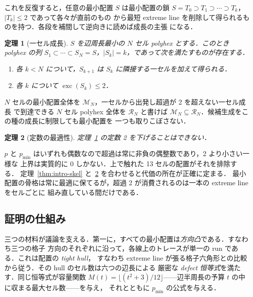 \documentclass[11pt]{article}
\theoremstyle{plain}
\newtheorem{theorem}{定理}[section]
\theoremstyle{definition}
\theoremstyle{remark}
\DeclareMathOperator{\exc}{exc}
\begin{document}
これを反復すると，任意の最小配置 \(S\) は最小配置の鎖
\(S=T_{0}\supset T_{1}\supset\cdots\supset T_{k}\)，\(|T_{k}|\le2\) であって各々が直前のもの
から最短 extreme line を削除して得られるものを持つ．各段を補間して逆向きに読めば成長の主張
になる．

\begin{theorem}[一セル成長]\label{thm:intro-main}
\(S\) を辺周長最小の \(N\) セル polyhex とする．このとき polyhex の列
\(S_{1}\subset\cdots\subset S_{N}=S\)，\(|S_{k}|=k\)，であって次を満たすものが存在する．
\begin{enumerate}
\item[(a)] 各 \(k<N\) について，\(S_{k+1}\) は \(S_{k}\) に隣接する一セルを加えて得られる．
\item[(b)] 各 \(k\) について \(\exc(S_{k})\le2\)．
\end{enumerate}
\end{theorem}

\(N\) セルの最小配置全体を \(\mathcal{M}_{N}\)，一セルから出発し超過が 2 を超えない一セル成長
で到達できる \(N\) セル polyhex 全体を \(\mathcal{R}_{N}\) と書けば
\(\mathcal{M}_{N}\subseteq\mathcal{R}_{N}\)．候補生成をこの種の成長に制限しても最小配置を
一つも取りこぼさない．

\begin{theorem}[定数の最適性]\label{thm:intro-sharp}
定理~\ref{thm:intro-main} の定数 2 を下げることはできない．
\end{theorem}

\(p\) と \(p_{\min}\) はいずれも偶数なので超過は常に非負の偶整数であり，2 より小さい一様な
上界は実質的に 0 しかない．上で触れた 13 セルの配置がそれを排除する．
定理~\ref{thm:intro-skel} と~\ref{thm:intro-sharp} を合わせると代価の所在が正確に定まる．
最小配置の骨格は常に最適に保てるが，超過 2 が消費されるのは一本の extreme line をセルごとに
組み直している間だけである．

\subsection{証明の仕組み}\label{sec:0.3}

三つの材料が議論を支える．第一に，すべての最小配置は\emph{方向凸}である．すなわち三つの格子
方向のそれぞれに沿って，各線上のトレースが単一の run である．これは配置の \emph{tight hull}，
すなわち extreme line が張る格子六角形との比較から従う．その hull のセル数は六つの辺長による
厳密な \emph{defect 恒等式}を満たす．同じ恒等式が容量関数
\(M(t)=\lfloor(t^{2}+3)/12\rfloor\)——辺半周長の予算 \(t\) の中に収まる最大セル数——を与え，
それとともに \(p_{\min}\) の公式を与える．
\end{document}
